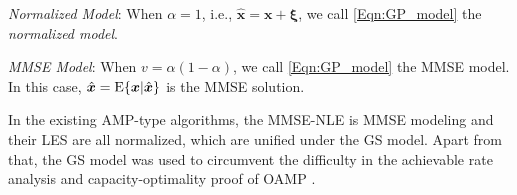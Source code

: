 \documentclass[journal]{IEEEtran}
\newcommand{\mr}{\mathrm}
\newcommand{\BE}{\begin{equation}}
\newcommand{\EE}{\end{equation}}
\renewcommand{\bf}{\bm}
\newtheorem{lemma}[theorem]{Lemma}
\begin{document}
{\color{black}\textit{Normalized Model}: When $\alpha=1$, i.e., $\hat{\bf{x}} = \bf{x} + \bf{\xi}$, we call \eqref{Eqn:GP_model} the \textit{normalized model}. %

\textit{MMSE Model}: When $v =\alpha(1-\alpha)$, we call \eqref{Eqn:GP_model} the MMSE model.
In this case, ${\hat {\bm x}}={\rm E}\{\bf{x}|{\hat {\bm x}}\}$ is the MMSE solution. 

In the existing AMP-type algorithms, the MMSE-NLE is MMSE modeling and their LES are all normalized, which are unified under the GS model. Apart from that, the GS model was used to circumvent the difficulty in the achievable rate analysis and capacity-optimality proof of OAMP \cite{OAMP_ISIT22, OAMP_TCOM}.}




\end{document}
